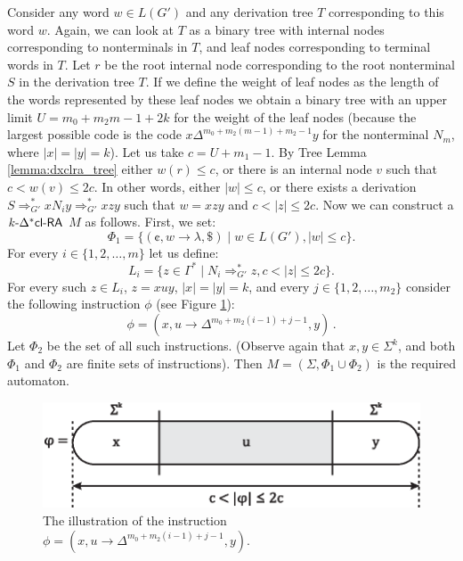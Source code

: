 Consider any word $w \in L(G')$ and any derivation tree $T$ corresponding to this word $w$. Again, we can look at $T$ as a binary tree with internal nodes corresponding to nonterminals in $T$, and leaf nodes corresponding to terminal words in $T$. Let $r$ be the root internal node corresponding to the root nonterminal $S$ in the derivation tree $T$. If we define the weight of leaf nodes as the length of the words represented by these leaf nodes we obtain a binary tree with an upper limit $U = m_0 + m_2 m - 1 + 2k$ for the weight of the leaf nodes (because the largest possible code is the code $x \Delta^{m_0 + m_2 (m - 1) + m_2 - 1} y$ for the nonterminal $N_m$, where $|x| = |y| = k$). Let us take $c = U + m_1 - 1$. By Tree Lemma \ref{lemma:dxclra_tree} either $w(r) \le c$, or there is an internal node $v$ such that $c < w(v) \le 2c$. In other words, either $|w| \le c$, or there exists a derivation $S \Rightarrow_{G'}^* x N_i y \Rightarrow_{G'}^* xzy$ such that $w = xzy$ and $c < |z| \le 2c$. Now we can construct a $\kDXclRA[k]$ $M$ as follows.
First, we set:
$$\Phi_1 = \{ (\cent, w \to \lambda, \$) \mid w \in L(G'), |w| \le c \}.$$
For every $i \in \{1, 2, \ldots, m\}$ let us define:
$$L_i = \{z \in \Gamma^* \mid N_i \Rightarrow_{G'}^* z, c < |z| \le 2c\}.$$
For every such $z \in L_i$, $z = x u y$, $|x| = |y| = k$, and every $j \in \{1, 2, \ldots, m_2\}$ consider the following instruction $\phi$ (see Figure \ref{figure:instruction_phi}):
$$\phi = (x, u \to \Delta^{m_0 + m_2 (i - 1) + j - 1}, y)\,.$$
Let $\Phi_2$ be the set of all such instructions. (Observe again that $x, y \in \Sigma^k$, and both $\Phi_1$ and $\Phi_2$ are finite sets of instructions). Then $M = (\Sigma, \Phi_1 \cup \Phi_2)$ is the required automaton.

\begin{figure}[htp]
\centering
\includegraphics[scale=1.0]{instruction_phi.eps}
\caption[The illustration of the instruction $\phi$.]
{The illustration of the instruction $\phi = (x, u \to \Delta^{m_0 + m_2 (i - 1) + j - 1}, y)$.}
\label{figure:instruction_phi}
\end{figure}

